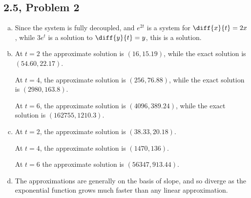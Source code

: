 \documentclass[10pt]{mypackage}
\begin{document}
\subsection{2.5, Problem 2}%
\begin{enumerate}[(a)]
  \item Since the system is fully decoupled, and $e^{2t}$ is a system for $\diff{x}{t} = 2x$, while $3e^{t}$ is a solution to $\diff{y}{t} = y$, this is a solution.
  \item At $t=2$ the approximate solution is $(16,15.19)$, while the exact solution is $(54.60,22.17)$.\newline

    At $t = 4$, the approximate solution is $(256,76.88)$, while the exact solution is $\left(2980,163.8\right)$.\newline

    At $t=6$, the approximate solution is $\left(4096,389.24\right)$, while the exact solution is $\left(162755,1210.3\right)$.
  \item At $t=2$, the approximate solution is $\left(38.33,20.18\right)$.\newline

    At $t=4$, the approximate solution is $\left(1470,136\right)$.\newline

    At $t=6$ the approximate solution is $\left(56347,913.44\right)$.
  \item The approximations are generally on the basis of slope, and so diverge as the exponential function grows much faster than any linear approximation.
\end{enumerate}
\end{document}
